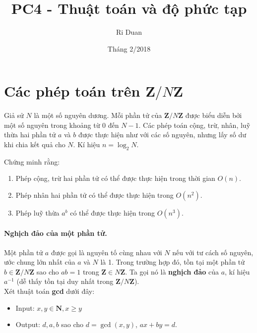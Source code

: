 \documentclass{article}
\title{PC4 - Thuật toán và độ phức tạp}
\author{Ri Duan}
\date{Tháng 2/2018}
\let\mb\mathbf
\begin{document}
\maketitle
\section{Các phép toán trên $\mb Z/ N\mb Z$}

\paragraph{}

Giả sử $N$ là một số nguyên dương. Mỗi phần tử của $\mb Z / N\mb Z$ được biểu diễn bởi một số nguyên trong khoảng từ $0$ đến $N-1$. Các phép toán cộng, trừ, nhân, luỹ thừa hai phần tử $a$ và $b$ được thực hiện như với các số nguyên, nhưng lấy số dư khi chia kết quả cho $N$. Kí hiệu $n = \log_2 N$. 

\begin{em}
Chứng minh rằng:

\begin{enumerate}
    \item Phép cộng, trừ hai phần tử có thể được thực hiện trong thời gian $O(n)$. 
    \item Phép nhân hai phần tử có thể được thực hiện trong $O(n^2)$.
    \item Phép luỹ thừa $a^b$ có thể được thực hiện trong $O(n^3)$.
\end{enumerate}
\end{em}

\paragraph{Nghịch đảo của một phần tử. } Một phần tử $a$ được gọi là nguyên tố cùng nhau với $N$ nếu với tư cách số nguyên, ước chung lớn nhất của $a$ và $N$ là 1. Trong trường hợp đó, tồn tại một phần tử $b \in \mb Z/ N \mb Z$ sao cho $ab = 1$ trong $\mb Z \in N \mb Z$. Ta gọi nó là \textbf{nghịch đảo} của $a$, kí hiệu $a^{-1}$ (dễ thấy tồn tại duy nhất trong $\mb Z /N\mb Z$).\\

Xét thuật toán \textbf{gcd} dưới đây:

\begin{itemize}
    \item Input: $x, y \in \mathbf N, x\geq y$
    \item Output: $d, a, b$ sao cho $d = \gcd(x, y)$, $ax + by =d$.
\end{itemize}
\end{document}
